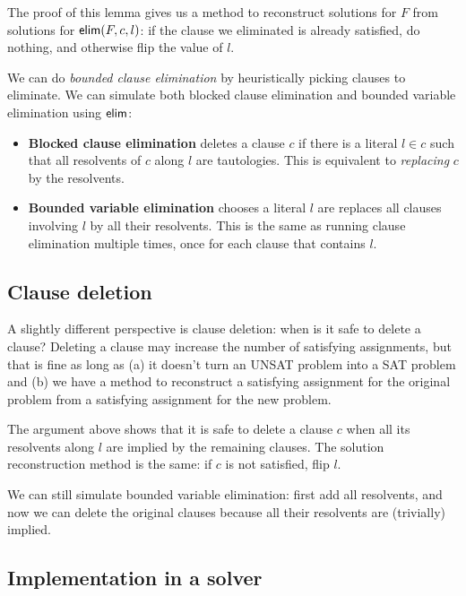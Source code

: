 \documentclass[a4paper, 11pt]{article}
\theoremstyle{definition}
\begin{document}
The proof of this lemma gives us a method to reconstruct solutions for $F$ from solutions for $\mathsf{elim}(F,c,l)$: if the clause we eliminated is already satisfied, do nothing, and otherwise flip the value of $l$.

We can do \emph{bounded clause elimination} by heuristically picking clauses to eliminate. We can simulate both blocked clause elimination and bounded variable elimination using $\mathsf{elim}$:

\begin{itemize}
  \item \textbf{Blocked clause elimination} deletes a clause $c$ if there is a literal $l \in c$ such that all resolvents of $c$ along $l$ are tautologies. This is equivalent to \emph{replacing} $c$ by the resolvents.
  \item \textbf{Bounded variable elimination} chooses a literal $l$ are replaces all clauses involving $l$ by all their resolvents. This is the same as running clause elimination multiple times, once for each clause that contains $l$.
\end{itemize}

\subsection*{Clause deletion}

A slightly different perspective is clause deletion: when is it safe to delete a clause? Deleting a clause may increase the number of satisfying assignments, but that is fine as long as (a) it doesn't turn an UNSAT problem into a SAT problem and (b) we have a method to reconstruct a satisfying assignment for the original problem from a satisfying assignment for the new problem.

The argument above shows that it is safe to delete a clause $c$ when all its resolvents along $l$ are implied by the remaining clauses. The solution reconstruction method is the same: if $c$ is not satisfied, flip $l$.

We can still simulate bounded variable elimination: first add all resolvents, and now we can delete the original clauses because all their resolvents are (trivially) implied.

\subsection*{Implementation in a solver}
\end{document}
